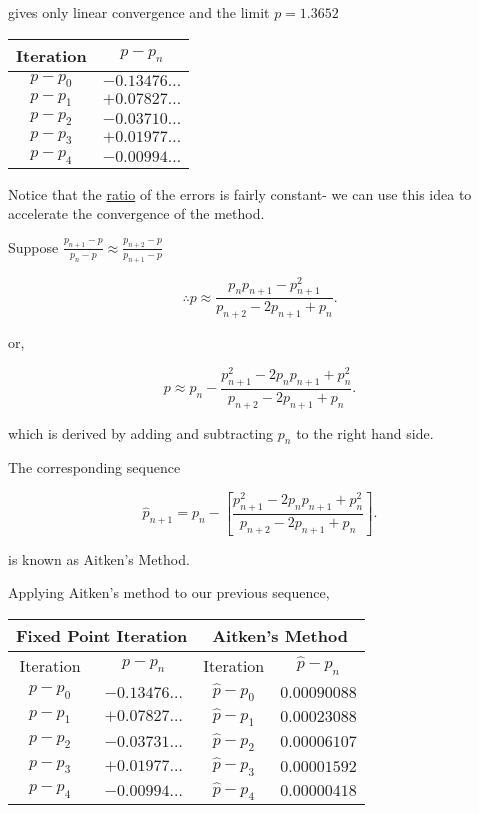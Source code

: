 \documentclass[12pt]{article}
\begin{document}
gives only linear convergence and the limit $p=1.3652$

\begin{table}[h]
    \centering
    \begin{tabular}{c c}
        \toprule
        Iteration & $p - p_n$ \\
        \midrule
        $p - p_0$ & $-0.13476\ldots$ \\
        $p - p_1$ & $+0.07827\ldots$ \\
        $p - p_2$ & $-0.03710\ldots$ \\
        $p - p_3$ & $+0.01977\ldots$ \\
        $p - p_4$ & $-0.00994\ldots$ \\
        \bottomrule
    \end{tabular}
\end{table}

Notice that the \uline{ratio} of the errors is fairly constant- we can use this
idea to accelerate the convergence of the method.

Suppose $\displaystyle \frac{p_{n+1}-p}{p_n-p} \approx \frac{p_{n+2}-p}{p_{n+1}-p}$

\[
  \therefore p \approx \frac{p_n p_{n+1} - p_{n+1}^2}{p_{n+2}-2p_{n+1}+p_n}
.\]

or,

\[
  p \approx p_n - \frac{p_{n+1}^2 - 2p_n p_{n+1} + p_n^2}{p_{n+2}-2p_{n+1}+p_n}
.\]

which is derived by adding and subtracting $p_n$ to the right hand side.

The corresponding sequence

\[
  \hat{p}_{n+1} = p_n - \left[ \frac{p_{n+1}^2-2p_np_{n+1}+p_n^2}{p_{n+2}-2p_{n+1}+p_n} \right]
.\]

is known as Aitken's Method.

\pagebreak
Applying Aitken's method to our previous sequence,

\begin{table}[h]
    \centering
    \begin{tabular}{c c | c c}
        \toprule
        \multicolumn{2}{c|}{Fixed Point Iteration} & \multicolumn{2}{c}{Aitken's Method} \\
        \midrule
        Iteration & $p - p_n$ & Iteration & $\hat{p} - p_n$ \\
        \midrule
        $p - p_0$ & $-0.13476\ldots$ & $\hat{p} - p_0$ & $0.00090088$ \\
        $p - p_1$ & $+0.07827\ldots$ & $\hat{p} - p_1$ & $0.00023088$ \\
        $p - p_2$ & $-0.03731\ldots$ & $\hat{p} - p_2$ & $0.00006107$ \\
        $p - p_3$ & $+0.01977\ldots$ & $\hat{p} - p_3$ & $0.00001592$ \\
        $p - p_4$ & $-0.00994\ldots$ & $\hat{p} - p_4$ & $0.00000418$ \\
        \bottomrule
    \end{tabular}
\end{table}
\end{document}
